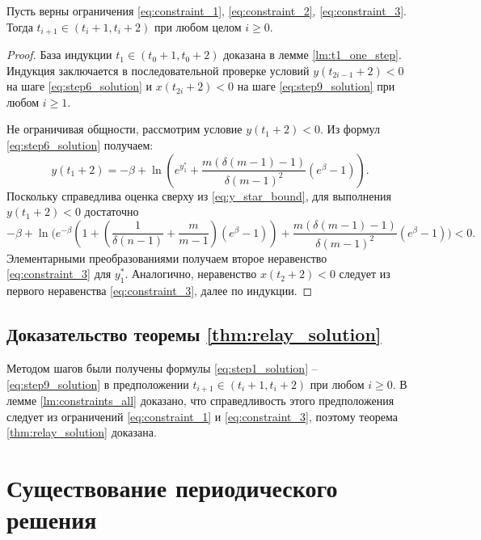 \begin{lemma}
	\label{lm:constraints_all}
	Пусть верны ограничения \eqref{eq:constraint_1}, \eqref{eq:constraint_2}, \eqref{eq:constraint_3}. Тогда $t_{i + 1} \in (t_i + 1, t_i + 2)$ при любом целом $i \geqslant 0$.
\end{lemma}
\begin{proof}
	
	База индукции $t_1 \in (t_0 + 1, t_0 + 2)$ доказана в лемме \eqref{lm:t1_one_step}. Индукция заключается в последовательной проверке условий $y(t_{2i - 1} + 2) < 0$ на шаге \eqref{eq:step6_solution} и $x(t_{2i} + 2) < 0$ на шаге \eqref{eq:step9_solution} при любом $i \geqslant 1$.
	
	Не ограничивая общности, рассмотрим условие $y(t_1 + 2) < 0$. Из формул \eqref{eq:step6_solution} получаем:
	\[
	y(t_1 + 2) = -\beta + \ln\left(e^{y_1^*} + \frac{m(\delta(m - 1) - 1)}{\delta (m - 1)^2}(e^\beta - 1) \right).
	\]
	Поскольку справедлива оценка сверху из \eqref{eq:y_star_bound}, для выполнения $y(t_1 + 2) < 0$ достаточно
	\small
	\[
	-\beta + \ln\Bigg(e^{-\beta} \left(1 + \left( \dfrac{1}{\delta(n - 1)} + \dfrac{m}{m - 1} \right)(e^{\beta} - 1)\right) + \frac{m(\delta(m - 1) - 1)}{\delta (m - 1)^2} (e^\beta - 1) \Bigg) < 0.
	\]
	\normalsize
	Элементарными преобразованиями получаем второе неравенство \eqref{eq:constraint_3} для $y_1^*$. Аналогично, неравенство $x(t_2 + 2) < 0$ следует из первого неравенства \eqref{eq:constraint_3}, далее по индукции.
\end{proof}

\subsection{Доказательство теоремы \ref{thm:relay_solution}} 
Методом шагов были получены формулы \eqref{eq:step1_solution} -- \eqref{eq:step9_solution} в предположении $t_{i + 1} \in (t_i + 1, t_i + 2)$ при любом $i \geqslant 0$. В лемме \ref{lm:constraints_all} доказано, что справедливость этого предположения следует из ограничений \eqref{eq:constraint_1} и \eqref{eq:constraint_3}, поэтому теорема \ref{thm:relay_solution} доказана.


\section{Существование периодического решения}\label{sec:ch3/sect4}

